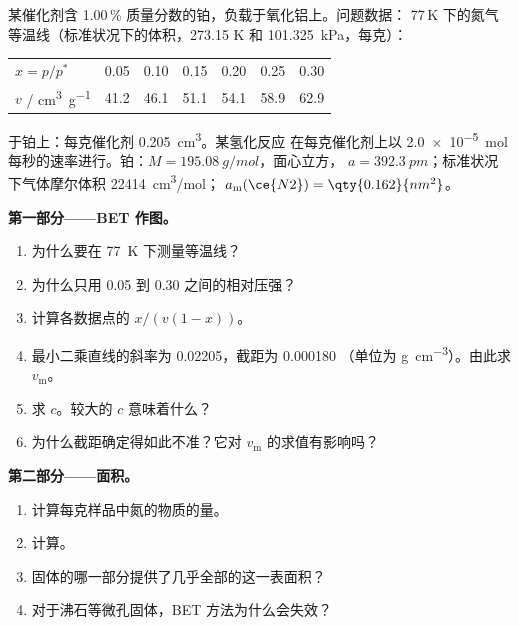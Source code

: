 \begin{problem}
\label{pb:b3:surfaces-catalysis:1}
某催化剂含 1.00\,\% 质量分数的铂，负载于氧化铝上。问题数据：
77\,K 下的氮气等温线（标准状况下的体积，273.15 K 和
\qty{101.325}{kPa}，每克）：
\begin{center}\small
\begin{tabular}{lcccccc}
\hline
$x = p/p^*$ & 0.05 & 0.10 & 0.15 & 0.20 & 0.25 & 0.30 \\
$v$ / \unit{cm^3.g^{-1}} & 41.2 & 46.1 & 51.1 & 54.1 & 58.9 & 62.9 \\ \hline
\end{tabular}
\end{center}
 于铂上：每克催化剂 \qty{0.205}{cm^3}。某氢化反应
在每克催化剂上以 \qty{2.0e-5}{mol} 每秒的速率进行。铂：$M = \qty{195.08}{g/mol}$，面心立方，
$a = \qty{392.3}{pm}$；标准状况下气体摩尔体积 \qty{22414}{cm^3/mol}；
$a_{\mathrm m}(\ce{N2}) = \qty{0.162}{nm^2}$。

\medskip\noindent\textbf{第一部分——BET 作图。}
\begin{enumerate}
  \item 为什么要在 \qty{77}{K} 下测量等温线？
  \item 为什么只用 0.05 到 0.30 之间的相对压强？
  \item 计算各数据点的 $x/(v(1 - x))$。
  \item 最小二乘直线的斜率为 \num{0.02205}，截距为 \num{0.000180}
        （单位为 \unit{g.cm^{-3}}）。由此求 $v_{\mathrm m}$。
  \item 求 $c$。较大的 $c$ 意味着什么？
  \item 为什么截距确定得如此不准？它对 $v_{\mathrm m}$ 的求值有影响吗？
\end{enumerate}

\medskip\noindent\textbf{第二部分——面积。}
\begin{enumerate}[resume]
  \item 计算每克样品中氮的物质的量。
  \item 计算。
  \item 固体的哪一部分提供了几乎全部的这一表面积？
  \item 对于沸石等微孔固体，BET 方法为什么会失效？
\end{enumerate}


\end{problem}
